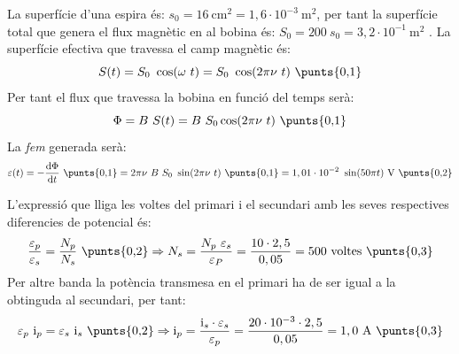 \begin{solapartat}
La superfície d'una espira és: $s_0 = 16\ \mathrm{cm^2} = 1,6\cdot 10^{-3}\ \mathrm{m^2}$, per tant la superfície total que genera el flux magnètic en al bobina és: $S_0 = 200\ s_0 = 3,2\cdot 10^{-1}\ \mathrm{m^2}$ . La superfície efectiva que travessa el camp magnètic és:
\[ S(t) = S_0\ \cos(\omega\ t) = S_0\ \cos(2\pi\nu\ t)\ \text{\punts{0,1}} \]
Per tant el flux que travessa la bobina en funció del temps serà:
\[ \Phi = B\ S(t) = B\ S_0\cos(2\pi\nu\ t)\ \text{\punts{0,1}} \]
La \textit{fem} generada serà:
\[ \varepsilon(t) = -\frac{\mathrm{d}\Phi}{\mathrm{d}t}\ \text{\punts{0,1}} = 2\pi\nu\ B\ S_0\ \sin(2\pi\nu\ t)\ \text{\punts{0,1}} = 1,01\cdot 10^{-2}\ \sin(50\pi t)\ \mathrm{V}\ \text{\punts{0,2}} \]
\end{solapartat}

\begin{solapartat}
L'expressió que lliga les voltes del primari i el secundari amb les seves respectives diferencies de potencial és:
\[ \frac{\varepsilon_p}{\varepsilon_s} = \frac{N_p}{N_s}\ \text{\punts{0,2}} \Rightarrow N_s = \frac{N_p\ \varepsilon_s}{\varepsilon_P} = \frac{10\cdot 2,5}{0,05} = 500\ \text{voltes}\ \text{\punts{0,3}} \]
Per altre banda la potència transmesa en el primari ha de ser igual a la obtinguda al secundari, per tant:
\[ \varepsilon_p\ \mathrm{i}_p = \varepsilon_s\ \mathrm{i}_s\ \text{\punts{0,2}} \Rightarrow \mathrm{i}_p = \frac{\mathrm{i}_s\cdot\varepsilon_s}{\varepsilon_p} = \frac{20\cdot 10^{-3}\cdot 2,5}{0,05} = 1,0\ \mathrm{A}\ \text{\punts{0,3}} \]
\end{solapartat}
